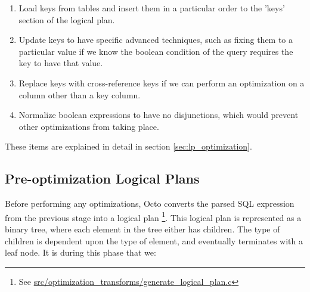\documentclass[]{article}
\newcommand{\gitlab}[1]{\footnote{See \href{https://gitlab.com/YottaDB/DBMS/YDBOcto/blob/master/#1}{#1}}}
\begin{document}
\begin{enumerate}
	\item Load keys from tables and insert them in a particular order to the 'keys' section of the logical plan.
	\item Update keys to have specific advanced techniques, such as fixing them to a particular value if we know the boolean condition of the query requires the key to have that value.
	\item Replace keys with cross-reference keys if we can perform an optimization on a column other than a key column.
	\item Normalize boolean expressions to have no disjunctions, which would prevent other optimizations from taking place.
\end{enumerate}

These items are explained in detail in section \ref{sec:lp_optimization}.

\subsection{Pre-optimization Logical Plans}

Before performing any optimizations, Octo converts the parsed SQL expression from the previous stage into a logical plan \gitlab{src/optimization\_transforms/generate\_logical\_plan.c}.
This logical plan is represented as a binary tree, where each element in the tree either has children. The type of children is dependent upon the type of element, and eventually terminates with a leaf node.
It is during this phase that we:
\end{document}
